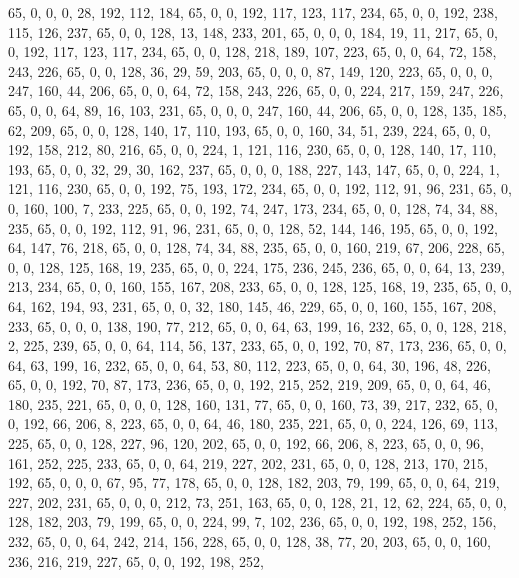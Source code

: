 \begin{DoxyCode}
       65, 0, 0, 0, 28, 192, 112, 184, 65, 0, 0, 192, 117, 123, 117, 234, 65, 0, 0, 192, 238, 115, 126, 237, 65, 0,
       0, 128, 13, 148, 233, 201, 65, 0, 0, 0, 184, 19, 11, 217, 65, 0, 0, 192, 117, 123, 117, 234, 65, 0, 0, 128,
       218, 189, 107, 223, 65, 0, 0, 64, 72, 158, 243, 226, 65, 0, 0, 128, 36, 29, 59, 203, 65, 0, 0, 0, 87, 149,
       120, 223, 65, 0, 0, 0, 247, 160, 44, 206, 65, 0, 0, 64, 72, 158, 243, 226, 65, 0, 0, 224, 217, 159, 247, 226,
       65, 0, 0, 64, 89, 16, 103, 231, 65, 0, 0, 0, 247, 160, 44, 206, 65, 0, 0, 128, 135, 185, 62, 209, 65, 0, 0,
       128, 140, 17, 110, 193, 65, 0, 0, 160, 34, 51, 239, 224, 65, 0, 0, 192, 158, 212, 80, 216, 65, 0, 0, 224,
       1, 121, 116, 230, 65, 0, 0, 128, 140, 17, 110, 193, 65, 0, 0, 32, 29, 30, 162, 237, 65, 0, 0, 0, 188, 227,
       143, 147, 65, 0, 0, 224, 1, 121, 116, 230, 65, 0, 0, 192, 75, 193, 172, 234, 65, 0, 0, 192, 112, 91, 96, 231,
       65, 0, 0, 160, 100, 7, 233, 225, 65, 0, 0, 192, 74, 247, 173, 234, 65, 0, 0, 128, 74, 34, 88, 235, 65, 0, 0,
       192, 112, 91, 96, 231, 65, 0, 0, 128, 52, 144, 146, 195, 65, 0, 0, 192, 64, 147, 76, 218, 65, 0, 0, 128,
       74, 34, 88, 235, 65, 0, 0, 160, 219, 67, 206, 228, 65, 0, 0, 128, 125, 168, 19, 235, 65, 0, 0, 224, 175, 236,
       245, 236, 65, 0, 0, 64, 13, 239, 213, 234, 65, 0, 0, 160, 155, 167, 208, 233, 65, 0, 0, 128, 125, 168, 19,
       235, 65, 0, 0, 64, 162, 194, 93, 231, 65, 0, 0, 32, 180, 145, 46, 229, 65, 0, 0, 160, 155, 167, 208, 233, 65,
       0, 0, 0, 138, 190, 77, 212, 65, 0, 0, 64, 63, 199, 16, 232, 65, 0, 0, 128, 218, 2, 225, 239, 65, 0, 0, 64,
       114, 56, 137, 233, 65, 0, 0, 192, 70, 87, 173, 236, 65, 0, 0, 64, 63, 199, 16, 232, 65, 0, 0, 64, 53, 80,
       112, 223, 65, 0, 0, 64, 30, 196, 48, 226, 65, 0, 0, 192, 70, 87, 173, 236, 65, 0, 0, 192, 215, 252, 219, 209,
       65, 0, 0, 64, 46, 180, 235, 221, 65, 0, 0, 0, 128, 160, 131, 77, 65, 0, 0, 160, 73, 39, 217, 232, 65, 0, 0,
       192, 66, 206, 8, 223, 65, 0, 0, 64, 46, 180, 235, 221, 65, 0, 0, 224, 126, 69, 113, 225, 65, 0, 0, 128, 227,
       96, 120, 202, 65, 0, 0, 192, 66, 206, 8, 223, 65, 0, 0, 96, 161, 252, 225, 233, 65, 0, 0, 64, 219, 227,
       202, 231, 65, 0, 0, 128, 213, 170, 215, 192, 65, 0, 0, 0, 67, 95, 77, 178, 65, 0, 0, 128, 182, 203, 79, 199,
       65, 0, 0, 64, 219, 227, 202, 231, 65, 0, 0, 0, 212, 73, 251, 163, 65, 0, 0, 128, 21, 12, 62, 224, 65, 0, 0,
       128, 182, 203, 79, 199, 65, 0, 0, 224, 99, 7, 102, 236, 65, 0, 0, 192, 198, 252, 156, 232, 65, 0, 0, 64, 242,
       214, 156, 228, 65, 0, 0, 128, 38, 77, 20, 203, 65, 0, 0, 160, 236, 216, 219, 227, 65, 0, 0, 192, 198, 252,

\end{DoxyCode}
